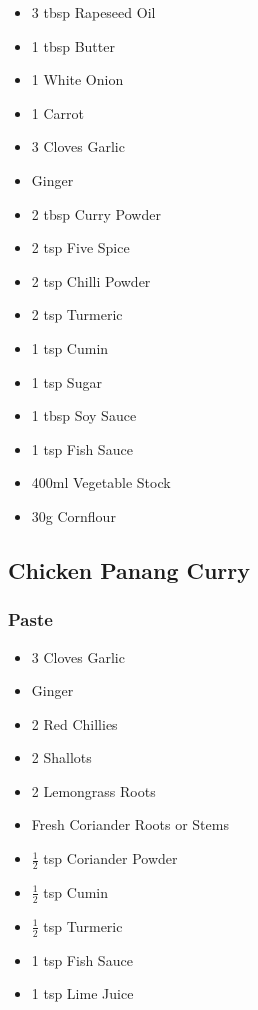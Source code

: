 \documentclass[11pt, english]{article}
\begin{document}
	\begin{itemize}
        \setlength\itemsep{0cm}
                \item 3 tbsp Rapeseed Oil
		\item 1 tbsp Butter
		\item 1 White Onion
		\item 1 Carrot
		\item 3 Cloves Garlic
		\item Ginger
		\item 2 tbsp Curry Powder
		\item 2 tsp Five Spice
		\item 2 tsp Chilli Powder
		\item 2 tsp Turmeric
		\item 1 tsp Cumin
		\item 1 tsp Sugar
		\item 1 tbsp Soy Sauce
		\item 1 tsp Fish Sauce
		\item 400ml Vegetable Stock
		\item 30g Cornflour
        \end{itemize}

\newpage

	\subsection{Chicken Panang Curry}

                \subsubsection*{Paste}

        \begin{itemize}
        \setlength\itemsep{0cm}
                \item 3 Cloves Garlic
                \item Ginger
                \item 2 Red Chillies
                \item 2 Shallots
                \item 2 Lemongrass Roots
                \item Fresh Coriander Roots or Stems
		\item $\frac{1}{2}$ tsp Coriander Powder
                \item $\frac{1}{2}$ tsp Cumin
		\item $\frac{1}{2}$ tsp Turmeric
                \item 1 tsp Fish Sauce
                \item 1 tsp Lime Juice
        \end{itemize}
\end{document}
